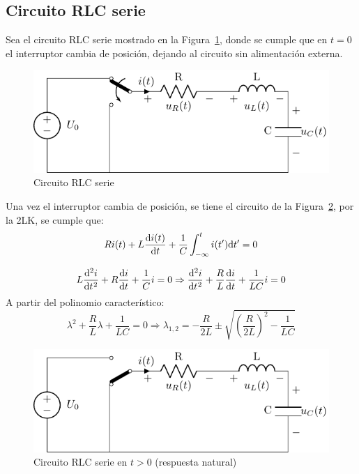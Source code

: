 	\subsection{Circuito RLC serie}

Sea el circuito RLC serie mostrado en la Figura~\ref{fig.transitorio_circuito_RLC_serie}, donde se cumple que en $t = 0$ el interruptor cambia de posición, dejando al circuito sin alimentación externa. 
\begin{figure}[H]
    \centering
    \includegraphics{../figs/transitorio_circuitoRLC_serie.pdf}
    \caption{Circuito RLC serie}
    \label{fig.transitorio_circuito_RLC_serie}
\end{figure}

Una vez el interruptor cambia de posición, se tiene el circuito de la Figura~\ref{fig.transitorio_serie_t0+}, por la 2LK, se cumple que:
\[
  Ri(t) + L\diff{i(t)}{t} + \frac{1}{C}\int_{-\infty}^t i(t') \mathrm{d}t' = 0
\]

\[
  L\diff[2]{i}{t} + R\diff{i}{t} + \frac{1}{C} i = 0 \Rightarrow
  {\diff[2]{i}{t} + \frac{R}{L} \diff{i}{t} + \frac{1}{LC} i = 0}
\]
A partir del polinomio característico: 
\[
\lambda^2 + \frac{R}{L} \lambda + \frac{1}{LC} = 0  \Rightarrow \lambda_{1,2} = -\frac{R}{2L} \pm \sqrt{\left(\frac{R}{2L}\right)^2 - \frac{1}{LC}}
\]
\begin{figure}[H]
    \centering
    \includegraphics{../figs/transitorio_circuitoRLC_serie_t0+.pdf}
    \caption{Circuito RLC serie en $t>0$ (respuesta natural)}
    \label{fig.transitorio_serie_t0+}
\end{figure}

